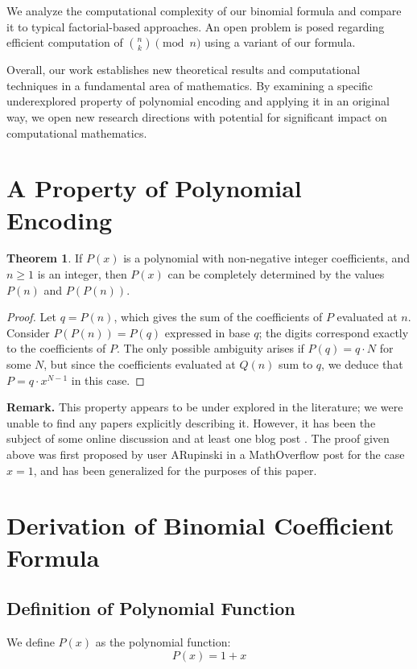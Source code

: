 \documentclass{article}
\theoremstyle{plain}
\theoremstyle{definition}
\newtheorem{thm}{Theorem}
\begin{document}
We analyze the computational complexity of our binomial formula and compare it to typical factorial-based approaches. An open problem is posed regarding efficient computation of $\binom{n}{k} \pmod n$ using a variant of our formula.

Overall, our work establishes new theoretical results and computational techniques in a fundamental area of mathematics. By examining a specific underexplored property of polynomial encoding and applying it in an original way, we open new research directions with potential for significant impact on computational mathematics.

\section{A Property of Polynomial Encoding}
\begin{thm}
\label{thm:1}
If \(P(x)\) is a polynomial with non-negative integer coefficients, and \(n \geq 1\) is an integer, then \(P(x)\) can be completely determined by the values $P(n)$ and $P(P(n))$.
\end{thm}

\begin{proof}
Let $q = P(n)$, which gives the sum of the coefficients of $P$ evaluated at $n$. Consider $P(P(n)) = P(q)$ expressed in base $q$; the digits correspond exactly to the coefficients of $P$. The only possible ambiguity arises if $P(q) = q\cdot N$ for some $N$, but since the coefficients evaluated at $Q(n)$ sum to $q$, we deduce that $P = q \cdot x^{N-1}$ in this case.
\end{proof}

\textbf{Remark.}
This property appears to be under explored in the literature; we were unable to find any papers explicitly describing it. However, it has been the subject of some online discussion and at least one blog post \cite{jcook}. The proof given above was first proposed by user ARupinski in a MathOverflow post \cite{arupinski} for the case $x=1$, and has been generalized for the purposes of this paper.

\section{Derivation of Binomial Coefficient Formula}
\subsection{Definition of Polynomial Function}
We define $P(x)$ as the polynomial function:
\begin{equation}
    P(x) = 1 + x
\end{equation}
\end{document}
